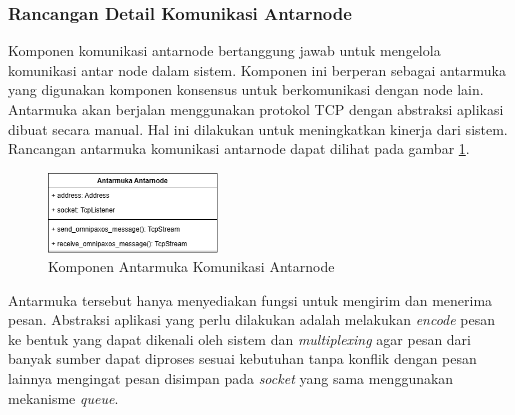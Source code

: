 \subsubsection{Rancangan Detail Komunikasi Antarnode}
\label{subsubsection:detail-komponen-internode-interface}

Komponen komunikasi antarnode bertanggung jawab untuk mengelola komunikasi antar node dalam sistem. Komponen ini berperan sebagai antarmuka yang digunakan komponen konsensus untuk berkomunikasi dengan node lain. Antarmuka akan berjalan menggunakan protokol TCP dengan abstraksi aplikasi dibuat secara manual. Hal ini dilakukan untuk meningkatkan kinerja dari sistem. Rancangan antarmuka komunikasi antarnode dapat dilihat pada gambar \ref{fig:internode-interface-component}.

\begin{figure}[ht]
    \centering
    \includegraphics[width=0.4\textwidth]{resources/chapter-3/internode-interface-component.png}
    \caption{Komponen Antarmuka Komunikasi Antarnode}
    \label{fig:internode-interface-component}
\end{figure}

Antarmuka tersebut hanya menyediakan fungsi untuk mengirim dan menerima pesan. Abstraksi aplikasi yang perlu dilakukan adalah melakukan \textit{encode} pesan ke bentuk yang dapat dikenali oleh sistem dan \textit{multiplexing} agar pesan dari banyak sumber dapat diproses sesuai kebutuhan tanpa konflik dengan pesan lainnya mengingat pesan disimpan pada \textit{socket} yang sama menggunakan mekanisme \textit{queue}.